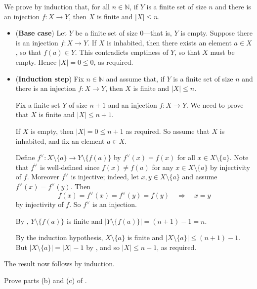 \begin{cproof}[of (a)]
\item We prove by induction that, for all $n \in \mathbb{N}$, if $Y$ is a finite set of size $n$ and there is an injection $f : X \to Y$, then $X$ is finite and $|X| \le n$.

\begin{itemize}
\item (\textbf{Base case}) Let $Y$ be a finite set of size $0$---that is, $Y$ is empty. Suppose there is an injection $f : X \to Y$. If $X$ is inhabited, then there exists an element $a \in X$, so that $f(a) \in Y$. This contradicts emptiness of $Y$, so that $X$ must be empty. Hence $|X| = 0 \le 0$, as required.

\item (\textbf{Induction step}) Fix $n \in \mathbb{N}$ and assume that, if $Y$ is a finite set of size $n$ and there is an injection $f : X \to Y$, then $X$ is finite and $|X| \le n$.

Fix a finite set $Y$ of size $n+1$ and an injection $f : X \to Y$. We need to prove that $X$ is finite and $|X| \le n+1$.

If $X$ is empty, then $|X| = 0 \le n+1$ as required. So assume that $X$ is inhabited, and fix an element $a \in X$.

Define $f^{\vee} : X \setminus \{ a \} \to Y \setminus \{ f(a) \}$ by $f^{\vee}(x) = f(x)$ for all $x \in X \setminus \{ a \}$. Note that $f^{\vee}$ is well-defined since $f(x) \ne f(a)$ for any $x \in X \setminus \{ a \}$ by injectivity of $f$. Moreover $f^{\vee}$ is injective; indeed, let $x,y \in X \setminus \{ a \}$ and assume $f^{\vee}(x) = f^{\vee}(y)$. Then
\[f(x) = f^{\vee}(x) = f^{\vee}(y) = f(y) \quad \Rightarrow \quad x=y\]
by injectivity of $f$. So $f^{\vee}$ is an injection.

By , $Y \setminus \{ f(a) \}$ is finite and $|Y \setminus \{ f(a) \}| = (n+1) - 1 = n$.

By the induction hypothesis, $X \setminus \{ a \}$ is finite and $|X \setminus \{ a \}| \le (n+1) - 1$. But $|X \setminus \{ a \}| = |X| - 1$ by , and so $|X| \le n+1$, as required.
\end{itemize}

The result now follows by induction.
\end{cproof}

\begin{exercise}
Prove parts (b) and (c) of .
\end{exercise}

